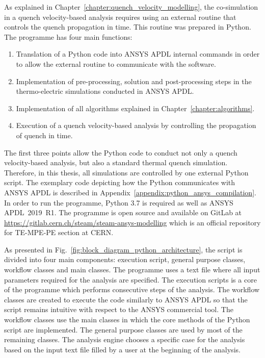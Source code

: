 
As explained in Chapter~\ref{chapter:quench_velocity_modelling}, the co-simulation in a quench velocity-based analysis requires using an external routine that controls the quench propagation in time. This routine was prepared in Python. The programme has four main functions: 

\begin{enumerate}
    \item Translation of a Python code into ANSYS APDL internal commands in order to allow the external routine to communicate with the software. 
    \item Implementation of pre-processing, solution and post-processing steps in the thermo-electric simulations conducted in ANSYS APDL.
    \item Implementation of all algorithms explained in Chapter~\ref{chapter:algorithms}.
    \item Execution of a quench velocity-based analysis by controlling the propagation of quench in time. 
\end{enumerate}

The first three points allow the Python code to conduct not only a quench velocity-based analysis, but also a standard thermal quench simulation. Therefore, in this thesis, all simulations are controlled by one external Python script. The exemplary code depicting how the Python communicates with ANSYS APDL is described in Appendix~\ref{appendix:python_ansys_compilation}. In order to run the programme, Python 3.7 is required as well as ANSYS APDL~2019~R1. The programme is open source and available on GitLab at \url{https://gitlab.cern.ch/steam/steam-ansys-modelling} which is an official repository for TE-MPE-PE section at CERN.

As presented in Fig.~\ref{fig:block_diagram_python_architecture}, the script is divided into four main components: execution script, general purpose classes, workflow classes and main classes. The programme uses a text file where all input parameters required for the analysis are specified. The execution scripts is a core of the programme which performs consecutive steps of the analysis. The workflow classes are created to execute the code similarly to ANSYS APDL so that the script remains intuitive with respect to the ANSYS commercial tool. The workflow classes use the main classes in which the core methods of the Python script are implemented. The general purpose classes are used by most of the remaining classes. The analysis engine chooses a specific case for the analysis based on the input text file filled by a user at the beginning of the analysis. 

